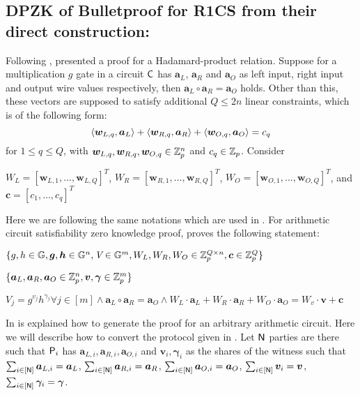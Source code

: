\subsection{DPZK of Bulletproof for R1CS from their direct construction:}
Following \cite{BCC+16}, \cite{bulletproofs} presented a proof for a Hadamard-product relation. Suppose for a multiplication $g$ gate in a circuit $\mathsf{C}$ has $\bm{a}_L$, $\bm{a}_R$ and $\bm{a}_O$ as left input, right input and output wire values respectively, then $\bm{a}_L \circ \bm{a}_R = \bm{a}_O$ holds. Other than this, these vectors are supposed to satisfy additional $Q\leq 2n$ linear constraints, which is of the following form:
$$\langle \bm{w}_{L,q},\bm{a}_L\rangle + \langle \bm{w}_{R,q},\bm{a}_R\rangle + \langle \bm{w}_{O,q},\bm{a}_O\rangle = c_q$$
for $1\leq q \leq Q$, with $\bm{w}_{L,q}, \bm{w}_{R,q}, \bm{w}_{O,q} \in \mathbb{Z}^n_p$ and $c_q \in \mathbb{Z}_p$.
Consider

$W_L = [\bm{w}_{L,1}, \ldots, \bm{w}_{L,Q}]^T$,\vspace{10pt} 
$W_R = [\bm{w}_{R,1}, \ldots, \bm{w}_{R,Q}]^T$, \vspace{10pt} 
$W_O = [\bm{w}_{O,1}, \ldots, \bm{w}_{O,Q}]^T$,\vspace{10pt} 
and $\bm{c} = [c_1, \ldots, c_q]^T$

Here we are following the same notations which are used in \cite{bulletproofs}.
For arithmetic circuit satisfiability zero knowledge proof, \cite{bulletproofs} proves the following statement:

 $\{g,h\in\mathbb{G}, \bm{g},\bm{h}\in \mathbb{G}^n, \textit{V}\in \mathbb{G}^m, W_L, W_R, W_O \in \mathbb{Z}^{Q\times n}_p, \bm{c}\in \mathbb{Z}^Q_p\}$

 $\{\bm{a}_L, \bm{a}_R, \bm{a}_O \in \mathbb{Z}^n_p, \bm{v},\bm{\gamma}\in \mathbb{Z}^m_p \}$

 $V_j = g^{v_j}h^{\gamma_j} \forall j\in[m] \wedge \bm{a}_L \circ \bm{a}_R = \bm{a}_O \wedge W_L\cdot \bm{a}_L + W_R\cdot \bm{a}_R + W_O\cdot \bm{a}_O = W_v\cdot \bm{v} +\bm{c}$

\noindent In \cite[Protocol 3]{bulletproofs} is explained how to generate the proof for an arbitrary arithmetic circuit. Here we will describe how to convert the protocol given in \cite[Protocol 3]{bulletproofs}. Let $\mathsf{N}$ parties are there such that $\mathsf{P}_i$ has $\bm{a}_{L,i}, \bm{a}_{R,i}, \bm{a}_{O,i}$ and $\bm{v}_{i}, \bm{\gamma}_i$ as the shares of the witness such that 
$\sum_{i\in[\mathsf{N}]} \bm{a}_{L,i} = \bm{a}_L$,
$\sum_{i\in[\mathsf{N}]} \bm{a}_{R,i} = \bm{a}_R$,
$\sum_{i\in[\mathsf{N}]} \bm{a}_{O,i} = \bm{a}_O$,
$\sum_{i\in[\mathsf{N}]} \bm{v}_{i} = \bm{v}$,
$\sum_{i\in[\mathsf{N}]} \bm{\gamma}_{i} = \bm{\gamma}$. 

